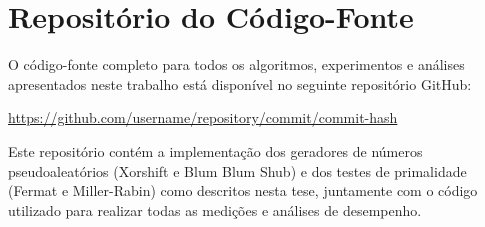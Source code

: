 \chapter{Repositório do Código-Fonte}
\label{apx:code-repository}

O código-fonte completo para todos os algoritmos, experimentos e análises apresentados neste trabalho está disponível no seguinte repositório GitHub:

\begin{center}
    \url{https://github.com/username/repository/commit/commit-hash}
\end{center}

Este repositório contém a implementação dos geradores de números pseudoaleatórios (Xorshift e Blum Blum Shub) e dos testes de primalidade (Fermat e Miller-Rabin) como descritos nesta tese, juntamente com o código utilizado para realizar todas as medições e análises de desempenho.

